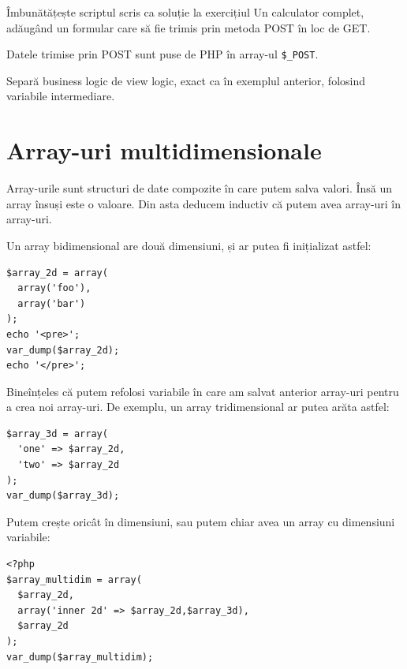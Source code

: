 
\begin{Exercise}[title={View Logic și Business Logic},difficulty=1]
Îmbunătățește scriptul scris ca soluție la exercițiul {\glqq}Un calculator complet{\grqq},
adăugând un formular care să fie trimis prin metoda POST în loc de GET.

Datele trimise prin POST sunt puse de PHP în array-ul \texttt{\$\_POST}.

Separă business logic de view logic, exact ca în exemplul anterior, folosind
variabile intermediare.
\end{Exercise}



\section{Array-uri multidimensionale}
Array-urile sunt structuri de date compozite în care putem salva valori.
Însă un array însuși este o valoare. Din asta deducem inductiv că
putem avea array-uri în array-uri.

Un array bidimensional are două dimensiuni, și ar putea fi inițializat
astfel:
\begin{lstlisting}
$array_2d = array(
  array('foo'),
  array('bar')
);
echo '<pre>';
var_dump($array_2d);
echo '</pre>';
\end{lstlisting}
Bineînțeles că putem refolosi variabile în care am salvat anterior array-uri
pentru a crea noi array-uri. De exemplu, un array tridimensional ar putea arăta
astfel:
\begin{lstlisting}
$array_3d = array(
  'one' => $array_2d,
  'two' => $array_2d
);
var_dump($array_3d);
\end{lstlisting}
Putem crește oricât în dimensiuni, sau putem chiar avea un array cu dimensiuni variabile:
\begin{lstlisting}
<?php
$array_multidim = array(
  $array_2d,
  array('inner 2d' => $array_2d,$array_3d),
  $array_2d
);
var_dump($array_multidim);
\end{lstlisting}

